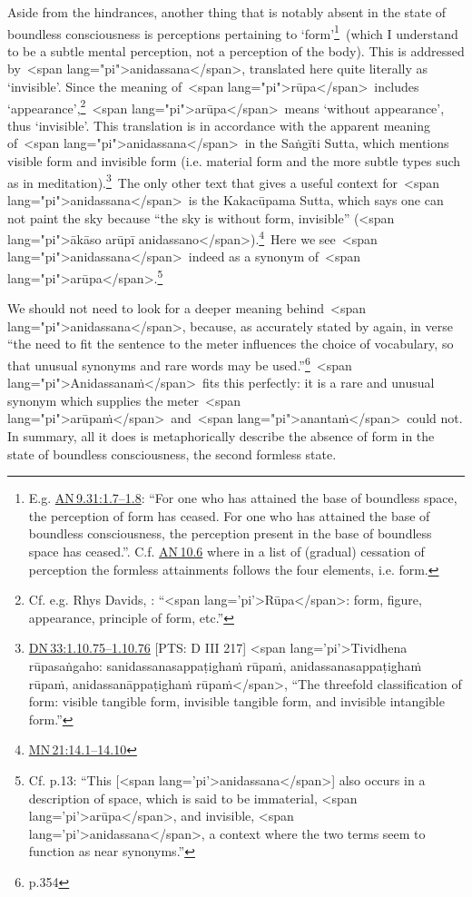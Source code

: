 \documentclass[10pt, openright]{book}
\begin{document}
Aside from the hindrances, another thing that is notably absent in the state of boundless consciousness is perceptions pertaining to ‘form’\footnote {E.g. \href{https://suttacentral.net/an9.31/en/sujato\#1.7}{AN 9.31:1.7–1.8}: “For one who has attained the base of boundless space, the perception of form has ceased. For one who has attained the base of boundless consciousness, the perception present in the base of boundless space has ceased.”. C.f. \href{https://suttacentral.net/an10.6/en/sujato}{AN 10.6} where in a list of (gradual) cessation of perception the formless attainments follows the four elements, i.e. form.} (which I understand to be a subtle mental perception, not a perception of the body). This is addressed by <span lang="pi">anidassana</span>, translated here quite literally as ‘invisible’. Since the meaning of <span lang="pi">rūpa</span> includes ‘appearance’,\footnote {Cf. e.g. Rhys Davids, \cite{PED}: “<span lang='pi'>Rūpa</span>: form, figure, appearance, principle of form, etc.”} <span lang="pi">arūpa</span> means ‘without appearance’, thus ‘invisible’. This translation is in accordance with the apparent meaning of <span lang="pi">anidassana</span> in the Saṅgīti Sutta, which mentions visible form and invisible form (i.e. material form and the more subtle types such as in meditation).\footnote {\href{https://suttacentral.net/dn33/en/sujato\#1.10.75}{DN 33:1.10.75–1.10.76} [PTS: D III 217] <span lang='pi'>Tividhena rūpasaṅgaho: sanidassanasappaṭighaṁ rūpaṁ, anidassanasappaṭighaṁ rūpaṁ, anidassanāppaṭighaṁ rūpaṁ</span>, “The threefold classification of form: visible tangible form, invisible tangible form, and invisible intangible form.”} The only other text that gives a useful context for <span lang="pi">anidassana</span> is the Kakacūpama Sutta, which says one can not paint the sky because “the sky is without form, invisible” (<span lang="pi">ākāso arūpī anidassano</span>).\footnote {\href{https://suttacentral.net/mn21/en/sujato\#14.1}{MN 21:14.1–14.10}} Here we see <span lang="pi">anidassana</span> indeed as a synonym of <span lang="pi">arūpa</span>.\footnote {Cf. \cite{Anālayo 2017} p.13: “This [<span lang='pi'>anidassana</span>] also occurs in a description of space, which is said to be immaterial, <span lang='pi'>arūpa</span>, and invisible, <span lang='pi'>anidassana</span>, a context where the two terms seem to function as near synonyms.”}


We should not need to look for a deeper meaning behind <span lang="pi">anidassana</span>, because, as accurately stated by \cite{Warder} again, in verse “the need to fit the sentence to the meter influences the choice of vocabulary, so that unusual synonyms and rare words may be used.”\footnote {\cite{Warder} p.354} <span lang="pi">Anidassanaṁ</span> fits this perfectly: it is a rare and unusual synonym which supplies the meter <span lang="pi">arūpaṁ</span> and <span lang="pi">anantaṁ</span> could not. In summary, all it does is metaphorically describe the absence of form in the state of boundless consciousness, the second formless state.
\end{document}
